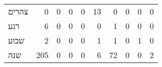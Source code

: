 \begin{table}[htbp!]
\begin{adjustbox}{width=1\textwidth}
\begin{tabular}{lrrrrrrrrr}
\texthebrew{צהרים}  &    0 &     0 &     0 &     0 &  13 &    0 &        0 &        0 &        0 \\
\texthebrew{רגע}    &    6 &     0 &     0 &     0 &   0 &    1 &        0 &        0 &        0 \\
\texthebrew{שבוע}   &    2 &     0 &     0 &     0 &   1 &    1 &        0 &        1 &        0 \\
\texthebrew{שנה}    &  205 &     0 &     0 &     0 &   6 &   72 &        0 &        0 &        2 \\
\bottomrule
\end{tabular}
\end{adjustbox}
\end{table}
